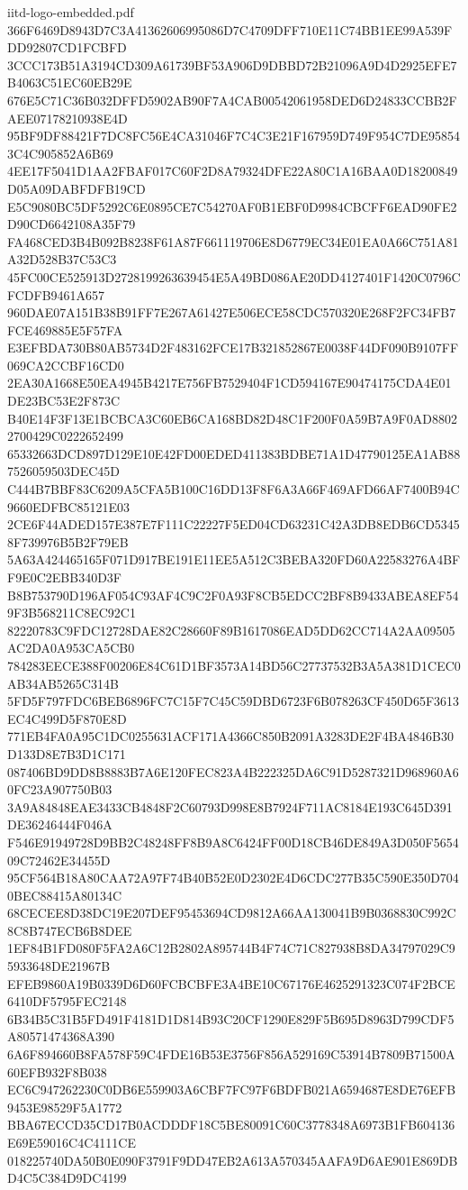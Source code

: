 \begin{filecontents*}[overwrite]{iitd-logo-embedded.pdf}
366F6469D8943D7C3A41362606995086D7C4709DFF710E11C74BB1EE99A539FDD92807CD1FCBFD
3CCC173B51A3194CD309A61739BF53A906D9DBBD72B21096A9D4D2925EFE7B4063C51EC60EB29E
676E5C71C36B032DFFD5902AB90F7A4CAB00542061958DED6D24833CCBB2FAEE07178210938E4D
95BF9DF88421F7DC8FC56E4CA31046F7C4C3E21F167959D749F954C7DE958543C4C905852A6B69
4EE17F5041D1AA2FBAF017C60F2D8A79324DFE22A80C1A16BAA0D18200849D05A09DABFDFB19CD
E5C9080BC5DF5292C6E0895CE7C54270AF0B1EBF0D9984CBCFF6EAD90FE2D90CD6642108A35F79
FA468CED3B4B092B8238F61A87F661119706E8D6779EC34E01EA0A66C751A81A32D528B37C53C3
45FC00CE525913D2728199263639454E5A49BD086AE20DD4127401F1420C0796CFCDFB9461A657
960DAE07A151B38B91FF7E267A61427E506ECE58CDC570320E268F2FC34FB7FCE469885E5F57FA
E3EFBDA730B80AB5734D2F483162FCE17B321852867E0038F44DF090B9107FF069CA2CCBF16CD0
2EA30A1668E50EA4945B4217E756FB7529404F1CD594167E90474175CDA4E01DE23BC53E2F873C
B40E14F3F13E1BCBCA3C60EB6CA168BD82D48C1F200F0A59B7A9F0AD88022700429C0222652499
65332663DCD897D129E10E42FD00EDED411383BDBE71A1D47790125EA1AB887526059503DEC45D
C444B7BBF83C6209A5CFA5B100C16DD13F8F6A3A66F469AFD66AF7400B94C9660EDFBC85121E03
2CE6F44ADED157E387E7F111C22227F5ED04CD63231C42A3DB8EDB6CD53458F739976B5B2F79EB
5A63A424465165F071D917BE191E11EE5A512C3BEBA320FD60A22583276A4BFF9E0C2EBB340D3F
B8B753790D196AF054C93AF4C9C2F0A93F8CB5EDCC2BF8B9433ABEA8EF549F3B568211C8EC92C1
82220783C9FDC12728DAE82C28660F89B1617086EAD5DD62CC714A2AA09505AC2DA0A953CA5CB0
784283EECE388F00206E84C61D1BF3573A14BD56C27737532B3A5A381D1CEC0AB34AB5265C314B
5FD5F797FDC6BEB6896FC7C15F7C45C59DBD6723F6B078263CF450D65F3613EC4C499D5F870E8D
771EB4FA0A95C1DC0255631ACF171A4366C850B2091A3283DE2F4BA4846B30D133D8E7B3D1C171
087406BD9DD8B8883B7A6E120FEC823A4B222325DA6C91D5287321D968960A60FC23A907750B03
3A9A84848EAE3433CB4848F2C60793D998E8B7924F711AC8184E193C645D391DE36246444F046A
F546E91949728D9BB2C48248FF8B9A8C6424FF00D18CB46DE849A3D050F565409C72462E34455D
95CF564B18A80CAA72A97F74B40B52E0D2302E4D6CDC277B35C590E350D7040BEC88415A80134C
68CECEE8D38DC19E207DEF95453694CD9812A66AA130041B9B0368830C992C8C8B747ECB6B8DEE
1EF84B1FD080F5FA2A6C12B2802A895744B4F74C71C827938B8DA34797029C95933648DE21967B
EFEB9860A19B0339D6D60FCBCBFE3A4BE10C67176E4625291323C074F2BCE6410DF5795FEC2148
6B34B5C31B5FD491F4181D1D814B93C20CF1290E829F5B695D8963D799CDF5A80571474368A390
6A6F894660B8FA578F59C4FDE16B53E3756F856A529169C53914B7809B71500A60EFB932F8B038
EC6C947262230C0DB6E559903A6CBF7FC97F6BDFB021A6594687E8DE76EFB9453E98529F5A1772
BBA67ECCD35CD17B0ACDDDF18C5BE80091C60C3778348A6973B1FB604136E69E59016C4C4111CE
018225740DA50B0E090F3791F9DD47EB2A613A570345AAFA9D6AE901E869DBD4C5C384D9DC4199

\end{filecontents*}
